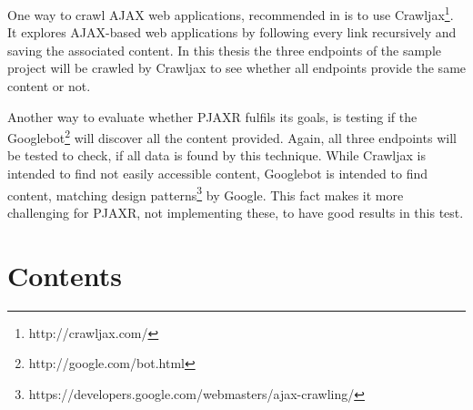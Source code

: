 \documentclass[f,bachelor,binding,twoside,palatino]{WeSTthesis}
\def \ajax {AJAX}
\def \pjaxr {PJAXR}
\begin{document}
  One way to crawl \ajax{} web applications, recommended in \cite{crawljax:tweb12} is to use Crawljax\footnote{http://crawljax.com/}. 
  It explores \ajax{}-based web applications by following every link recursively and saving the associated content. In this thesis the three endpoints of the sample project will be crawled by Crawljax to see whether all endpoints provide the same content or not.
  
  Another way to evaluate whether \pjaxr{} fulfils its goals, is testing if the Googlebot\footnote{http://google.com/bot.html} will discover all the content provided.
  Again, all three endpoints will be tested to check, if all data is found by this technique.
  While Crawljax is intended to find not easily accessible content, Googlebot is intended to find content, matching design patterns\footnote{https://developers.google.com/webmasters/ajax-crawling/} by Google. This fact makes it more challenging for \pjaxr{}, not implementing these, to have good results in this test.

\section{Contents}
\end{document}
